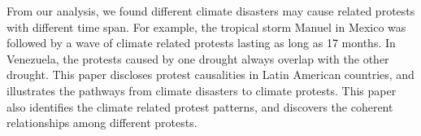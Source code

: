 \documentclass[9pt,twocolumn,twoside]{pnas-new}
\begin{document}
From our analysis, we found different climate disasters may cause related protests with different time span.
For example, the tropical storm Manuel in Mexico was followed by a wave of climate related protests lasting as long as 17 months.
In Venezuela, the protests caused by one drought always overlap with the other drought. This paper discloses protest causalities in Latin American countries, and illustrates the pathways from climate disasters to climate protests. This paper also identifies the climate related protest patterns, and discovers the coherent relationships among different protests.

\end{document}
